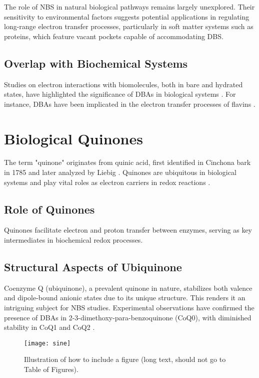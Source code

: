 The role of NBS in natural biological pathways remains largely unexplored. Their sensitivity to environmental factors suggests potential applications in regulating long-range electron transfer processes, particularly in soft matter systems such as proteins, which feature vacant pockets capable of accommodating DBS.

\subsection{Overlap with Biochemical Systems}
Studies on electron interactions with biomolecules, both in bare and hydrated states, have highlighted the significance of DBAs in biological systems \cite{gu2012interactions}. For instance, DBAs have been implicated in the electron transfer processes of flavins \cite{matthews2018observation}.

\section{Biological Quinones}
The term "quinone" originates from quinic acid, first identified in Cinchona bark in 1785 and later analyzed by Liebig \cite{chen2024low,rusell1873quinone}. Quinones are ubiquitous in biological systems and play vital roles as electron carriers in redox reactions \cite{ernster1995biochemical}.

\subsection{Role of Quinones}
Quinones facilitate electron and proton transfer between enzymes, serving as key intermediates in biochemical redox processes.

\subsection{Structural Aspects of Ubiquinone}
Coenzyme Q (ubiquinone), a prevalent quinone in nature, stabilizes both valence and dipole-bound anionic states due to its unique structure. This renders it an intriguing subject for NBS studies. Experimental observations have confirmed the presence of DBAs in 2-3-dimethoxy-para-benzoquinone (CoQ0), with diminished stability in CoQ1 and CoQ2 \cite{ameixa2023parent,west2014anion,pshenichnyuk2020ionizing,bull2015anion}.

\begin{figure}[th!]
  \centering
  \medskip
  \texttt{[image: sine]}
  \caption[Short caption for Table of Figures]{Illustration of how to
  include a figure (long text, should not go to Table of Figures).}
  \label{fig:sine}
\end{figure}

